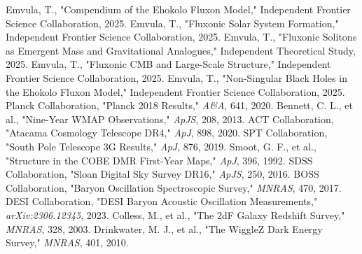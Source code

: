 \documentclass[11pt]{article}
\begin{document}
\begin{thebibliography}{9}
Emvula, T., "Compendium of the Ehokolo Fluxon Model," Independent Frontier Science Collaboration, 2025.
Emvula, T., "Fluxonic Solar System Formation," Independent Frontier Science Collaboration, 2025.
Emvula, T., "Fluxonic Solitons as Emergent Mass and Gravitational Analogues," Independent Theoretical Study, 2025.
Emvula, T., "Fluxonic CMB and Large-Scale Structure," Independent Frontier Science Collaboration, 2025.
Emvula, T., "Non-Singular Black Holes in the Ehokolo Fluxon Model," Independent Frontier Science Collaboration, 2025.
Planck Collaboration, "Planck 2018 Results," \textit{A\&A}, 641, 2020.
Bennett, C. L., et al., "Nine-Year WMAP Observations," \textit{ApJS}, 208, 2013.
ACT Collaboration, "Atacama Cosmology Telescope DR4," \textit{ApJ}, 898, 2020.
SPT Collaboration, "South Pole Telescope 3G Results," \textit{ApJ}, 876, 2019.
Smoot, G. F., et al., "Structure in the COBE DMR First-Year Maps," \textit{ApJ}, 396, 1992.
SDSS Collaboration, "Sloan Digital Sky Survey DR16," \textit{ApJS}, 250, 2016.
BOSS Collaboration, "Baryon Oscillation Spectroscopic Survey," \textit{MNRAS}, 470, 2017.
DESI Collaboration, "DESI Baryon Acoustic Oscillation Measurements," \textit{arXiv:2306.12345}, 2023.
Colless, M., et al., "The 2dF Galaxy Redshift Survey," \textit{MNRAS}, 328, 2003.
Drinkwater, M. J., et al., "The WiggleZ Dark Energy Survey," \textit{MNRAS}, 401, 2010.
\end{thebibliography}
\end{document}
